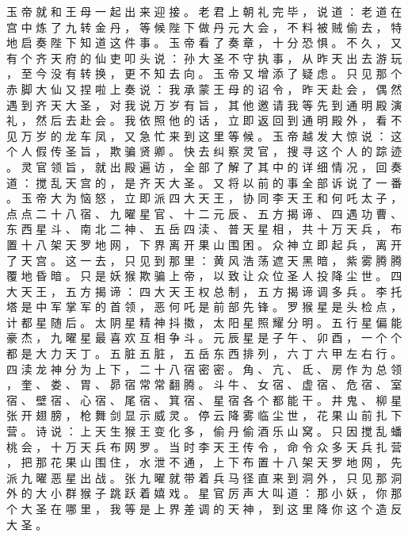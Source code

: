 {玉 帝 就 和 王 母 一 起 出 来 迎 接 。
老 君 上 朝 礼 完 毕 ， 说 道 ： 老 道 在 宫 中 炼 了 九 转 金 丹 ， 等 候 陛 下 做 丹 元 大 会 ， 不 料 被 贼 偷 去 ， 特 地 启 奏 陛 下 知 道 这 件 事 。
玉 帝 看 了 奏 章 ， 十 分 恐 惧 。
不 久 ， 又 有 个 齐 天 府 的 仙 吏 叩 头 说 ： 孙 大 圣 不 守 执 事 ， 从 昨 天 出 去 游 玩 ， 至 今 没 有 转 换 ， 更 不 知 去 向 。
玉 帝 又 增 添 了 疑 虑 。
只 见 那 个 赤 脚 大 仙 又 捏 啦 上 奏 说 ： 我 承 蒙 王 母 的 诏 令 ， 昨 天 赴 会 ， 偶 然 遇 到 齐 天 大 圣 ， 对 我 说 万 岁 有 旨 ， 其 他 邀 请 我 等 先 到 通 明 殿 演 礼 ， 然 后 去 赴 会 。
我 依 照 他 的 话 ， 立 即 返 回 到 通 明 殿 外 ， 看 不 见 万 岁 的 龙 车 凤 ， 又 急 忙 来 到 这 里 等 候 。
玉 帝 越 发 大 惊 说 ： 这 个 人 假 传 圣 旨 ， 欺 骗 贤 卿 。
快 去 纠 察 灵 官 ， 搜 寻 这 个 人 的 踪 迹 。
灵 官 领 旨 ， 就 出 殿 遍 访 ， 全 部 了 解 了 其 中 的 详 细 情 况 ， 回 奏 道 ： 搅 乱 天 宫 的 ， 是 齐 天 大 圣 。
又 将 以 前 的 事 全 部 诉 说 了 一 番 。
玉 帝 大 为 恼 怒 ， 立 即 派 四 大 天 王 ， 协 同 李 天 王 和 何 吒 太 子 ， 点 点 二 十 八 宿 、 九 曜 星 官 、 十 二 元 辰 、 五 方 揭 谛 、 四 遇 功 曹 、 东 西 星 斗 、 南 北 二 神 、 五 岳 四 渎 、 普 天 星 相 ， 共 十 万 天 兵 ， 布 置 十 八 架 天 罗 地 网 ， 下 界 离 开 果 山 围 困 。
众 神 立 即 起 兵 ， 离 开 了 天 宫 。
这 一 去 ， 只 见 到 那 里 ： 黄 风 浩 荡 遮 天 黑 暗 ， 紫 雾 腾 腾 覆 地 昏 暗 。
只 是 妖 猴 欺 骗 上 帝 ， 以 致 让 众 位 圣 人 投 降 尘 世 。
四 大 天 王 ， 五 方 揭 谛 ： 四 大 天 王 权 总 制 ， 五 方 揭 谛 调 多 兵 。
李 托 塔 是 中 军 掌 军 的 首 领 ， 恶 何 吒 是 前 部 先 锋 。
罗 猴 星 是 头 检 点 ， 计 都 星 随 后 。
太 阴 星 精 神 抖 擞 ， 太 阳 星 照 耀 分 明 。
五 行 星 偏 能 豪 杰 ， 九 曜 星 最 喜 欢 互 相 争 斗 。
元 辰 星 是 子 午 、 卯 酉 ， 一 个 个 都 是 大 力 天 丁 。
五 脏 五 脏 ， 五 岳 东 西 排 列 ， 六 丁 六 甲 左 右 行 。
四 渎 龙 神 分 为 上 下 ， 二 十 八 宿 密 密 。
角 、 亢 、 氐 、 房 作 为 总 领 ， 奎 、 娄 、 胃 、 昴 宿 常 常 翻 腾 。
斗 牛 、 女 宿 、 虚 宿 、 危 宿 、 室 宿 、 壁 宿 、 心 宿 、 尾 宿 、 箕 宿 、 星 宿 各 个 都 能 干 。
井 鬼 、 柳 星 张 开 翅 膀 ， 枪 舞 剑 显 示 威 灵 。
停 云 降 雾 临 尘 世 ， 花 果 山 前 扎 下 营 。
诗 说 ： 上 天 生 猴 王 变 化 多 ， 偷 丹 偷 酒 乐 山 窝 。
只 因 搅 乱 蟠 桃 会 ， 十 万 天 兵 布 网 罗 。
当 时 李 天 王 传 令 ， 命 令 众 多 天 兵 扎 营 ， 把 那 花 果 山 围 住 ， 水 泄 不 通 ， 上 下 布 置 十 八 架 天 罗 地 网 ， 先 派 九 曜 恶 星 出 战 。
张 九 曜 就 带 着 兵 马 径 直 来 到 洞 外 ， 只 见 那 洞 外 的 大 小 群 猴 子 跳 跃 着 嬉 戏 。
星 官 厉 声 大 叫 道 ： 那 小 妖 ， 你 那 个 大 圣 在 哪 里 ， 我 等 是 上 界 差 调 的 天 神 ， 到 这 里 降 你 这 个 造 反 大 圣 。
}

